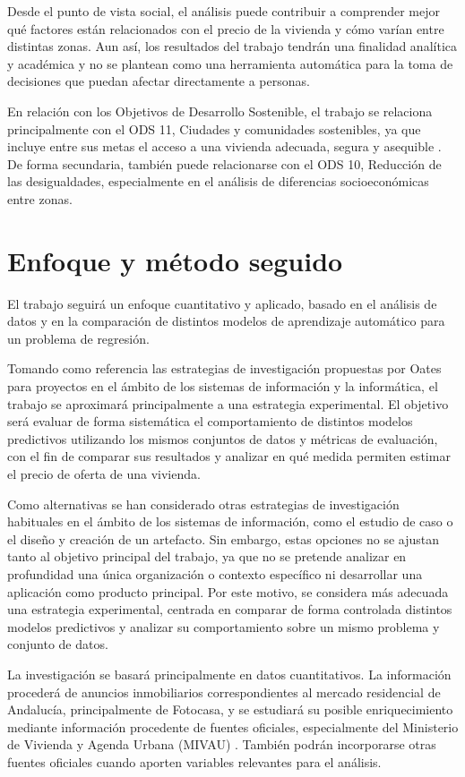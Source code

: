 \documentclass[IB]{TFUOC}%
\begin{document}
Desde el punto de vista social, el análisis puede contribuir a comprender mejor qué factores están relacionados con el precio de la vivienda y cómo varían entre distintas zonas. Aun así, los resultados del trabajo tendrán una finalidad analítica y académica y no se plantean como una herramienta automática para la toma de decisiones que puedan afectar directamente a personas.

En relación con los Objetivos de Desarrollo Sostenible, el trabajo se relaciona principalmente con el ODS 11, Ciudades y comunidades sostenibles, ya que incluye entre sus metas el acceso a una vivienda adecuada, segura y asequible \cite{onu_ods}. De forma secundaria, también puede relacionarse con el ODS 10, Reducción de las desigualdades, especialmente en el análisis de diferencias socioeconómicas entre zonas.


\section{Enfoque y método seguido}

El trabajo seguirá un enfoque cuantitativo y aplicado, basado en el análisis de datos y en la comparación de distintos modelos de aprendizaje automático para un problema de regresión.

Tomando como referencia las estrategias de investigación propuestas por Oates \cite{oates2006} para proyectos en el ámbito de los sistemas de información y la informática, el trabajo se aproximará principalmente a una estrategia experimental. El objetivo será evaluar de forma sistemática el comportamiento de distintos modelos predictivos utilizando los mismos conjuntos de datos y métricas de evaluación, con el fin de comparar sus resultados y analizar en qué medida permiten estimar el precio de oferta de una vivienda.

Como alternativas se han considerado otras estrategias de investigación habituales en el ámbito de los sistemas de información, como el estudio de caso o el diseño y creación de un artefacto. Sin embargo, estas opciones no se ajustan tanto al objetivo principal del trabajo, ya que no se pretende analizar en profundidad una única organización o contexto específico ni desarrollar una aplicación como producto principal. Por este motivo, se considera más adecuada una estrategia experimental, centrada en comparar de forma controlada distintos modelos predictivos y analizar su comportamiento sobre un mismo problema y conjunto de datos.

La investigación se basará principalmente en datos cuantitativos. La información procederá de anuncios inmobiliarios correspondientes al mercado residencial de Andalucía, principalmente de Fotocasa, y se estudiará su posible enriquecimiento mediante información procedente de fuentes oficiales, especialmente del Ministerio de Vivienda y Agenda Urbana (MIVAU) \cite{mivau_transacciones}. También podrán incorporarse otras fuentes oficiales cuando aporten variables relevantes para el análisis.
\end{document}
